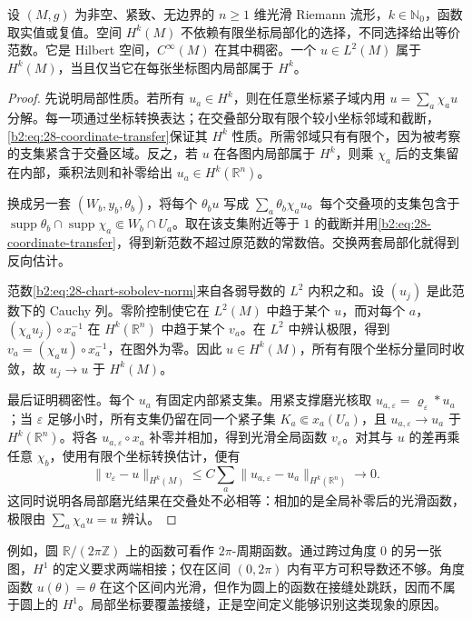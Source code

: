 \begin{theorem}\label{b2:thm:28-sobolev-basic}
设 \((M,g)\) 为非空、紧致、无边界的 \(n\geq1\) 维光滑 Riemann 流形，\(k\in\mathbb N_0\)，函数取实值或复值。空间 \(H^k(M)\) 不依赖有限坐标局部化的选择，不同选择给出等价范数。它是 Hilbert 空间，\(C^\infty(M)\) 在其中稠密。一个 \(u\in L^2(M)\) 属于 \(H^k(M)\)，当且仅当它在每张坐标图内局部属于 \(H^k\)。
\end{theorem}
\begin{proof}
先说明局部性质。若所有 \(u_a\in H^k\)，则在任意坐标紧子域内用 \(u=\sum_a\chi_a u\) 分解。每一项通过坐标转换表达；在交叠部分取有限个较小坐标邻域和截断，\eqref{b2:eq:28-coordinate-transfer}保证其 \(H^k\) 性质。所需邻域只有有限个，因为被考察的支集紧含于交叠区域。反之，若 \(u\) 在各图内局部属于 \(H^k\)，则乘 \(\chi_a\) 后的支集留在内部，乘积法则和补零给出 \(u_a\in H^k(\mathbb R^n)\)。

换成另一套 \((W_b,y_b,\theta_b)\)，将每个 \(\theta_bu\) 写成 \(\sum_a\theta_b\chi_au\)。每个交叠项的支集包含于 \(\operatorname{supp}\theta_b\cap\operatorname{supp}\chi_a\Subset W_b\cap U_a\)。取在该支集附近等于 \(1\) 的截断并用\eqref{b2:eq:28-coordinate-transfer}，得到新范数不超过原范数的常数倍。交换两套局部化就得到反向估计。

范数\eqref{b2:eq:28-chart-sobolev-norm}来自各弱导数的 \(L^2\) 内积之和。设 \((u_j)\) 是此范数下的 Cauchy 列。零阶控制使它在 \(L^2(M)\) 中趋于某个 \(u\)，而对每个 \(a\)，\((\chi_au_j)\circ x_a^{-1}\) 在 \(H^k(\mathbb R^n)\) 中趋于某个 \(v_a\)。在 \(L^2\) 中辨认极限，得到 \(v_a=(\chi_au)\circ x_a^{-1}\)，在图外为零。因此 \(u\in H^k(M)\)，所有有限个坐标分量同时收敛，故 \(u_j\to u\) 于 \(H^k(M)\)。

最后证明稠密性。每个 \(u_a\) 有固定内部紧支集。用紧支撑磨光核取 \(u_{a,\varepsilon}=\varrho_\varepsilon*u_a\)；当 \(\varepsilon\) 足够小时，所有支集仍留在同一个紧子集 \(K_a\Subset x_a(U_a)\)，且 \(u_{a,\varepsilon}\to u_a\) 于 \(H^k(\mathbb R^n)\)。将各 \(u_{a,\varepsilon}\circ x_a\) 补零并相加，得到光滑全局函数 \(v_\varepsilon\)。对其与 \(u\) 的差再乘任意 \(\chi_b\)，使用有限个坐标转换估计，便有
\[
 \|v_\varepsilon-u\|_{H^k(M)}
 \leq C\sum_a\|u_{a,\varepsilon}-u_a\|_{H^k(\mathbb R^n)}\longrightarrow0.
\]
这同时说明各局部磨光结果在交叠处不必相等：相加的是全局补零后的光滑函数，极限由 \(\sum_a\chi_a u=u\) 辨认。
\end{proof}

例如，圆 \(\mathbb R/(2\pi\mathbb Z)\) 上的函数可看作 \(2\pi\)-周期函数。通过跨过角度 \(0\) 的另一张图，\(H^1\) 的定义要求两端相接；仅在区间 \((0,2\pi)\) 内有平方可积导数还不够。角度函数 \(u(\theta)=\theta\) 在这个区间内光滑，但作为圆上的函数在接缝处跳跃，因而不属于圆上的 \(H^1\)。局部坐标要覆盖接缝，正是空间定义能够识别这类现象的原因。

